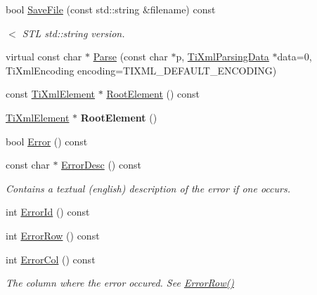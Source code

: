 \begin{DoxyCompactItemize}
\item 
\mbox{\label{class_ti_xml_document_a2b3d316ed658852876d4852cd39c42d8}} 
bool \hyperlink{class_ti_xml_document_a2b3d316ed658852876d4852cd39c42d8}{Save\+File} (const std\+::string \&filename) const
\begin{DoxyCompactList}\small\item\em $<$ S\+TL std\+::string version. \end{DoxyCompactList}\item 
virtual const char $\ast$ \hyperlink{class_ti_xml_document_a789ad2f06f93d52bdb5570b2f3670289}{Parse} (const char $\ast$p, \hyperlink{class_ti_xml_parsing_data}{Ti\+Xml\+Parsing\+Data} $\ast$data=0, Ti\+Xml\+Encoding encoding=T\+I\+X\+M\+L\+\_\+\+D\+E\+F\+A\+U\+L\+T\+\_\+\+E\+N\+C\+O\+D\+I\+NG)
\item 
const \hyperlink{class_ti_xml_element}{Ti\+Xml\+Element} $\ast$ \hyperlink{class_ti_xml_document_ab54e3a93279fcf0ac80f06ed9c52f04a}{Root\+Element} () const
\item 
\mbox{\label{class_ti_xml_document_a0b43e762a23f938b06651bc90b8a1013}} 
\hyperlink{class_ti_xml_element}{Ti\+Xml\+Element} $\ast$ {\bfseries Root\+Element} ()
\item 
bool \hyperlink{class_ti_xml_document_a348e68faad4a3498f413c51ee9bc321a}{Error} () const
\item 
\mbox{\label{class_ti_xml_document_aab511be262e84a003e3bb86f0215c8c2}} 
const char $\ast$ \hyperlink{class_ti_xml_document_aab511be262e84a003e3bb86f0215c8c2}{Error\+Desc} () const
\begin{DoxyCompactList}\small\item\em Contains a textual (english) description of the error if one occurs. \end{DoxyCompactList}\item 
int \hyperlink{class_ti_xml_document_abd928b49a646c8ed53e0453c555d96a2}{Error\+Id} () const
\item 
int \hyperlink{class_ti_xml_document_a062e5257128a7da31b0b2e38cd524600}{Error\+Row} () const
\item 
\mbox{\label{class_ti_xml_document_adea69de889449a2587afb8ee043f43f5}} 
int \hyperlink{class_ti_xml_document_adea69de889449a2587afb8ee043f43f5}{Error\+Col} () const
\begin{DoxyCompactList}\small\item\em The column where the error occured. See \hyperlink{class_ti_xml_document_a062e5257128a7da31b0b2e38cd524600}{Error\+Row()} \end{DoxyCompactList}\item 

\end{DoxyCompactItemize}
